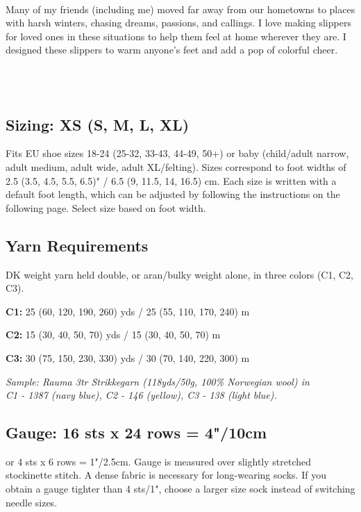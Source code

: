 \documentclass[12pt]{article}
\newcommand{\rowDir}[1]{\textbf{#1:}} %
\begin{document}
\begin{multicols}{2}
~\\
Many of my friends (including me) moved far away from our hometowns to places with harsh winters, chasing dreams, passions, and callings. I love making slippers for loved ones in these situations to help them feel at home wherever they are. I designed these slippers to warm anyone’s feet and add a pop of colorful cheer.

~\\
\vfill
~\\
\columnbreak

\subsection*{Sizing: XS (S, M, L, XL)}

Fits EU shoe sizes 18-24 (25-32, 33-43, 44-49, 50+) or baby (child/adult narrow, adult medium, adult wide, adult XL/felting). Sizes correspond to foot widths of 2.5 (3.5, 4.5, 5.5, 6.5)" / 6.5 (9, 11.5, 14, 16.5) cm. Each size is written with a default foot length, which can be adjusted by following the instructions on the following page. Select size based on foot width.


\subsection*{Yarn Requirements}

DK weight yarn held double, or aran/bulky weight alone, in three colors (C1, C2, C3).

{\fontsize{10pt}{12} \selectfont

\rowDir{C1} 25 (60, 120, 190, 260) yds / 25 (55, 110, 170, 240) m

\rowDir{C2} 15 (30, 40, 50, 70) yds / 15 (30, 40, 50, 70) m

\rowDir{C3} 30 (75, 150, 230, 330) yds / 30 (70, 140, 220, 300) m
}

{\scriptsize
\emph{Sample: Rauma 3tr Strikkegarn (118yds/50g, 100\% Norwegian wool) in \\C1 - 1387 (navy blue), C2 - 146 (yellow), C3 - 138 (light blue).}
}


\subsection*{Gauge: 16 sts x 24 rows = 4"/10cm}

or 4 sts x 6 rows = 1"/2.5cm. Gauge is measured over slightly stretched stockinette stitch. A dense fabric is necessary for long-wearing socks. If you obtain a gauge tighter than 4 sts/1", choose a larger size sock instead of switching needle sizes.


\end{multicols}
\end{document}
